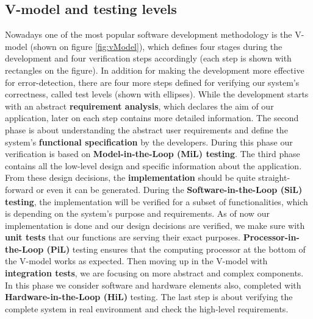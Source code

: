 \subsection{V-model and testing levels}
Nowadays one of the most popular software development methodology is the V-model \cite{Vmodel} (shown on figure \ref{fig:vModel}), which defines four stages during the development and four verification steps accordingly (each step is shown with rectangles on the figure). In addition for making the development more effective for error-detection, there are four more steps defined for verifying our system's correctness, called test levels \cite{TestLevels} (shown with ellipses). While the development starts with an abstract \textbf{requirement analysis}, which declares the aim of our application, later on each step contains more detailed information. The second phase is about understanding the abstract user requirements and define the system's \textbf{functional specification} by the developers. During this phase our verification is based on \textbf{Model-in-the-Loop (MiL) testing}. The third phase contains all the low-level design and specific information about the application. From these design decisions, the \textbf{implementation} should be quite straight-forward or even it can be generated. During the \textbf{Software-in-the-Loop (SiL) testing}, the implementation will be verified for a subset of functionalities, which is depending on the system's purpose and requirements.
As of now our implementation is done and our design decisions are verified, we make sure with \textbf{unit tests} that our functions are serving their exact purposes. \textbf{Processor-in-the-Loop (PiL)} testing ensures that the computing processor at the bottom of the V-model works as expected. Then moving up in the V-model with \textbf{integration tests}, we are focusing on more abstract and complex components. In this phase we consider software and hardware elements also, completed with \textbf{Hardware-in-the-Loop (HiL)} testing. The last step is about verifying the complete system in real environment and check the high-level requirements.


